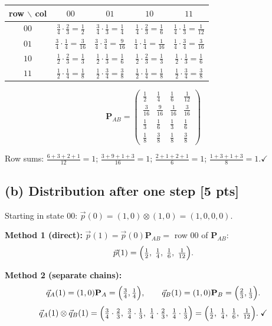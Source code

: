 \documentclass[11pt,a4paper]{article}
\begin{document}
\medskip
\begin{center}
\begin{tabular}{c|cccc}
row $\backslash$ col & $00$ & $01$ & $10$ & $11$ \\
\hline
$00$ & $\tfrac34\cdot\tfrac23=\tfrac12$ & $\tfrac34\cdot\tfrac13=\tfrac14$ & $\tfrac14\cdot\tfrac23=\tfrac16$ & $\tfrac14\cdot\tfrac13=\tfrac{1}{12}$ \\[4pt]
$01$ & $\tfrac34\cdot\tfrac14=\tfrac{3}{16}$ & $\tfrac34\cdot\tfrac34=\tfrac{9}{16}$ & $\tfrac14\cdot\tfrac14=\tfrac{1}{16}$ & $\tfrac14\cdot\tfrac34=\tfrac{3}{16}$ \\[4pt]
$10$ & $\tfrac12\cdot\tfrac23=\tfrac13$ & $\tfrac12\cdot\tfrac13=\tfrac16$ & $\tfrac12\cdot\tfrac23=\tfrac13$ & $\tfrac12\cdot\tfrac13=\tfrac16$ \\[4pt]
$11$ & $\tfrac12\cdot\tfrac14=\tfrac18$ & $\tfrac12\cdot\tfrac34=\tfrac38$ & $\tfrac12\cdot\tfrac14=\tfrac18$ & $\tfrac12\cdot\tfrac34=\tfrac38$ \\
\end{tabular}
\end{center}

\[
\mathbf{P}_{AB}=
\begin{pmatrix}
\tfrac{1}{2}  & \tfrac{1}{4}  & \tfrac{1}{6}  & \tfrac{1}{12} \\[5pt]
\tfrac{3}{16} & \tfrac{9}{16} & \tfrac{1}{16} & \tfrac{3}{16} \\[5pt]
\tfrac{1}{3}  & \tfrac{1}{6}  & \tfrac{1}{3}  & \tfrac{1}{6}  \\[5pt]
\tfrac{1}{8}  & \tfrac{3}{8}  & \tfrac{1}{8}  & \tfrac{3}{8}
\end{pmatrix}
\]

Row sums: $\tfrac{6+3+2+1}{12}=1$;\; $\tfrac{3+9+1+3}{16}=1$;\; $\tfrac{2+1+2+1}{6}=1$;\; $\tfrac{1+3+1+3}{8}=1$.\;$\checkmark$

\subsection*{(b) Distribution after one step [5 pts]}

Starting in state $00$: $\vec{p}(0)=(1,0)\otimes(1,0)=(1,0,0,0)$.

\textbf{Method 1 (direct):} $\vec{p}(1)=\vec{p}(0)\mathbf{P}_{AB}=$ row $00$ of $\mathbf{P}_{AB}$:
\[
\vec{p}(1)=\Bigl(\tfrac{1}{2},\;\tfrac{1}{4},\;\tfrac{1}{6},\;\tfrac{1}{12}\Bigr).
\]

\textbf{Method 2 (separate chains):}
\[
\vec{q}_A(1)=(1,0)\mathbf{P}_A=\Bigl(\tfrac{3}{4},\tfrac{1}{4}\Bigr),\qquad
\vec{q}_B(1)=(1,0)\mathbf{P}_B=\Bigl(\tfrac{2}{3},\tfrac{1}{3}\Bigr).
\]
\[
\vec{q}_A(1)\otimes\vec{q}_B(1)=\Bigl(\tfrac{3}{4}\cdot\tfrac{2}{3},\;\tfrac{3}{4}\cdot\tfrac{1}{3},\;\tfrac{1}{4}\cdot\tfrac{2}{3},\;\tfrac{1}{4}\cdot\tfrac{1}{3}\Bigr)=\Bigl(\tfrac{1}{2},\;\tfrac{1}{4},\;\tfrac{1}{6},\;\tfrac{1}{12}\Bigr).\;\checkmark
\]
\end{document}
